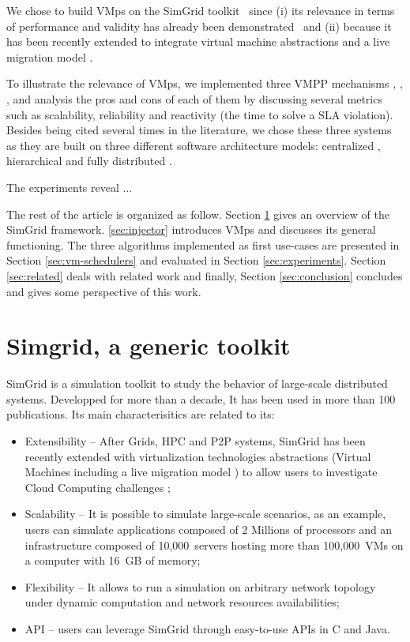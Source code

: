 \documentclass[conference]{IEEEtran}
\newcommand{\sg}{SimGrid\xspace}
\newcommand{\vmps}{VMps\xspace}
\begin{document}
%
We chose to build \vmps on the \sg
toolkit~\cite{casanova:hal-01017319} since (i) its relevance in
terms of performance and validity has already been
demonstrated~\cite{simgridpub} and (ii) because it has been
recently extended to integrate virtual machine abstractions and a live migration
model \cite{Hirofuchi:2013:ALM:2568486.2568524}.

To illustrate the relevance of \vmps, we implemented three VMPP
mechanisms \cite{Hermenier:2009:ECM:1508293.1508300},
\cite{feller:ccgrid12}, \cite{quesnel:cpe2012}, and analysis the pros
and cons of each of them by discussing several metrics such as
scalability, reliability and reactivity (\ie the time to solve a SLA
violation). Besides being cited several times in the literature, we
chose these three systems as they are built on three different
software architecture models: centralized
\cite{Hermenier:2009:ECM:1508293.1508300}, hierarchical
\cite{feller:ccgrid12} and fully distributed \cite{quesnel:cpe2012}.

The experiments reveal ...

The rest of the article is organized as follow. Section \ref{sec:sg}
gives an overview of the \sg framework.
\ref{sec:injector} introduces \vmps and discusses its general
functioning.
The three algorithms implemented as first use-cases are presented in
Section \ref{sec:vm-schedulers} and evaluated in Section
\ref{sec:experiments}.
Section \ref{sec:related} deals with related work and
finally, Section \ref{sec:conclusion} concludes and gives some perspective of this
work.

\section{Simgrid, a generic toolkit}
\label{sec:sg}

\sg is a simulation toolkit to study the behavior of
large-scale distributed systems.  Developped for more than  a decade, It has been used in more than 100
publications.  Its main characterisitics are related to its:
\begin{itemize}
\item Extensibility -- After Grids, HPC and P2P
  systems, \sg has been recently extended with virtualization technologies abstractions
(\ie Virtual Machines including a live migration model \cite{Hirofuchi:2013:ALM:2568486.2568524}) to allow users to investigate Cloud
Computing challenges \cite{lucas:cloud2014};
\item Scalability -- It is possible to simulate large-scale scenarios,
  as an example, users can simulate applications composed of 2
  Millions of processors and an infrastructure composed of 10,000~servers hosting more than
  100,000~VMs on a computer with 16~GB of memory;
\item  Flexibility -- It allows to run a simulation on arbitrary network
  topology under dynamic computation and network resources
  availabilities;
\item API --  users can leverage \sg through easy-to-use APIs in C
  and Java.
\end{itemize}
\end{document}
